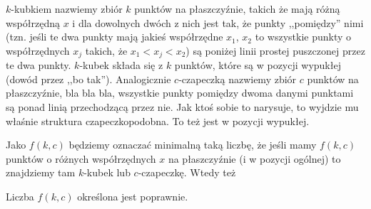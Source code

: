 $k$-kubkiem nazwiemy zbiór $k$ punktów na płaszczyźnie, takich że mają różną współrzędną $x$ i dla dowolnych dwóch z nich jest tak, że punkty ,,pomiędzy'' nimi (tzn. jeśli te dwa punkty mają jakieś współrzędne $x_1$, $x_2$ to wszystkie punkty o współrzędnych $x_j$ takich, że $x_1 < x_j < x_2$) są poniżej linii prostej puszczonej przez te dwa punkty. $k$-kubek składa się z $k$ punktów, które są w pozycji wypukłej (dowód przez ,,bo tak'').  Analogicznie $c$-czapeczką nazwiemy zbiór $c$ punktów na płaszczyźnie, bla bla bla, wszystkie punkty pomiędzy dwoma danymi punktami są ponad linią przechodzącą przez nie. Jak ktoś sobie to narysuje, to wyjdzie mu właśnie struktura czapeczkopodobna. To też jest w pozycji wypukłej.

Jako $f(k,c)$ będziemy oznaczać minimalną taką liczbę, że jeśli mamy $f(k,c)$ punktów o różnych współrzędnych $x$ na płaszczyźnie (i w pozycji ogólnej) to znajdziemy tam $k$-kubek lub $c$-czapeczkę. Wtedy też
\begin{theorem}
	Liczba $f(k,c)$ określona jest poprawnie.
\end{theorem}
